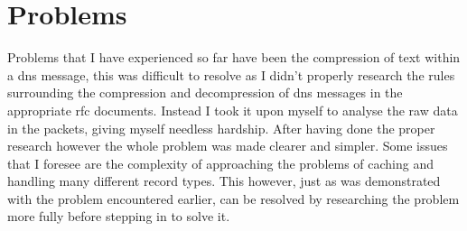 \documentclass[a4paper]{article}
\begin{document}
\section{Problems}
Problems that I have experienced so far have been the compression of text within a dns message, this was difficult to resolve as I didn't properly research the rules surrounding the compression and decompression of dns messages in the appropriate rfc documents. Instead I took it upon myself to analyse the raw data in the packets, giving myself needless hardship. After having done the proper research however the whole problem was made clearer and simpler. Some issues that I foresee are the complexity of approaching the problems of caching and handling many different record types. This however, just as was demonstrated with the problem encountered earlier, can be resolved by researching the problem more fully before stepping in to solve it.
\end{document}
